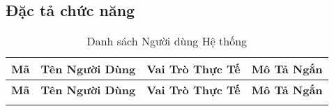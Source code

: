 \subsection{Đặc tả chức năng}
\begin{longtable}{|m{1.5cm}|m{3.5cm}|m{4.5cm}|m{5cm}|}
	\caption{Danh sách Người dùng Hệ thống} \label{tab:users}                                                                                                                                                                                                      \\
	\hline
	\textbf{Mã} & \textbf{Tên Người Dùng}    & \textbf{Vai Trò Thực Tế}                                  & \textbf{Mô Tả Ngắn}                                                                                                                                     \\
	\hline
	\endfirsthead

	\hline
	\textbf{Mã} & \textbf{Tên Người Dùng}    & \textbf{Vai Trò Thực Tế}                                  & \textbf{Mô Tả Ngắn}                                                                                                                                     \\
	\hline
	\endhead %

	\hline
	\endfoot %

	\hline
	\endlastfoot %


\end{longtable}
